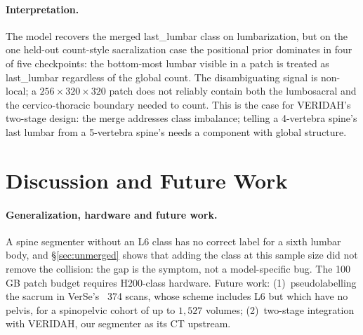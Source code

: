 \documentclass{article}
\newcommand{\VERIDAH}{VERIDAH}
\newcommand{\VerSe}{VerSe}
\begin{document}
\paragraph{Interpretation.}
The model recovers the merged last\_lumbar class on
lumbarization, but on the one held-out count-style
sacralization case the positional prior dominates in
four of five checkpoints:
the bottom-most lumbar visible
in a patch is treated as last\_lumbar regardless of the
global count. The disambiguating signal is non-local; a
$256{\times}320{\times}320$ patch does not reliably contain
both the lumbosacral and the cervico-thoracic boundary
needed to count. This is the case for \VERIDAH{}'s
two-stage design: the merge addresses class imbalance;
telling a 4-vertebra spine's last lumbar from a 5-vertebra
spine's needs a component with global structure.

\section{Discussion and Future Work}
\label{sec:discussion}

\paragraph{Generalization, hardware and future work.}
A spine segmenter without an L6 class has no correct
label for a sixth lumbar body, and \S\ref{sec:unmerged}
shows that adding the class at this sample size did not
remove the collision: the gap is the symptom, not a
model-specific bug. The 100\,GB patch budget requires
H200-class hardware. Future work: (1)~pseudolabelling the
sacrum in
\VerSe{}'s~\citep{Sekuboyina2021VerSe:Images} 374
scans, whose scheme includes L6 but which have no
pelvis, for a spinopelvic cohort of up to
$1{,}527$ volumes; (2)~two-stage
integration with \VERIDAH{}, our segmenter as its CT
upstream.
\end{document}
